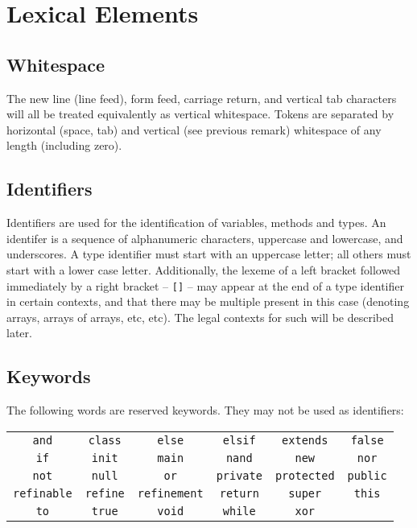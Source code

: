 \section{Lexical Elements}
\subsection{Whitespace}
The new line (line feed), form feed, carriage return, and vertical tab characters will all be treated equivalently as vertical whitespace. Tokens are separated by horizontal (space, tab) and vertical (see previous remark) whitespace of any length (including zero).

\subsection{Identifiers}
Identifiers are used for the identification of variables,  methods and types. An identifer is a sequence of alphanumeric characters, uppercase and lowercase, and underscores. A type identifier must start with an uppercase letter; all others must start with a lower case letter. Additionally, the lexeme of a left bracket followed immediately by a right bracket -- \verb![]! -- may appear at the end of a type identifier in certain contexts, and that there may be multiple present in this case (denoting arrays, arrays of arrays, etc, etc). The legal contexts for such will be described later.

\subsection{Keywords}
The following words are reserved keywords. They may not be used as identifiers:
\begin{center}
\begin{tabular}{cccccc}
\verb!and! & \verb!class! & \verb!else! & \verb!elsif! & \verb!extends! & \verb!false!\\
\verb!if! & \verb!init! & \verb!main! & \verb!nand! & \verb!new! & \verb!nor!\\
\verb!not! & \verb!null! & \verb!or! & \verb!private! & \verb!protected! & \verb!public!\\
\verb!refinable! & \verb!refine! & \verb!refinement! & \verb!return! & \verb!super! & \verb!this!\\
\verb!to! & \verb!true! & \verb!void! & \verb!while! & \verb!xor!\\
\end{tabular}
\end{center}

